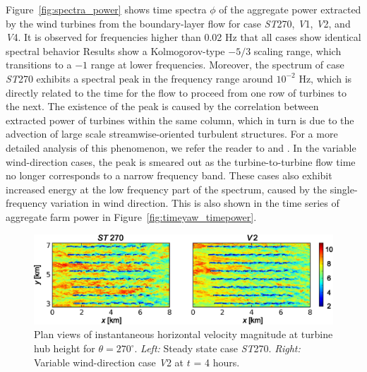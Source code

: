 		Figure~\ref{fig:spectra_power} shows time spectra $\phi$ of the aggregate power extracted by the wind turbines from the boundary-layer flow for case \emph{ST}270, \emph{V}1, \emph{V}2, and \emph{V}4. It is observed for frequencies higher than 0.02 Hz that all cases show identical spectral behavior Results show a Kolmogorov-type $-5/3$ scaling range, which transitions to a $-1$ range at lower frequencies. Moreover, the spectrum  of case \emph{ST}270 exhibits a spectral peak in the frequency range around $10^{-2}$ Hz, which is directly related to the time for the flow to proceed from one row of turbines to the next. The existence of the peak is caused by the correlation between extracted power of turbines within the same column, which in turn is due to the advection of large scale streamwise-oriented turbulent structures. For a more detailed analysis of this phenomenon, we refer the reader to \cite{stevens2014temporal} and \cite{bossuyt2017wind}. In the variable wind-direction cases, the peak is smeared out as the turbine-to-turbine flow time no longer corresponds to a narrow frequency band. These cases also exhibit increased energy at the low frequency part of the spectrum, caused by the single-frequency variation in wind direction. This is also shown in the time series of aggregate farm power in Figure~\ref{fig:timeyaw_timepower}.
		
		\begin{figure}[ht]
			\centering
			\includegraphics[width=\textwidth]{chapters/turbulent_inflow/blm/fig13_3}
			\caption{Plan views of instantaneous horizontal velocity magnitude at turbine hub height for $\theta = 270^\circ$. \emph{Left: } Steady state case \emph{ST}270. \emph{Right: } Variable wind-direction case \emph{V}2 at $t$ = 4 hours.}
			\label{fig:explanation_undershoot}
		\end{figure}
		
